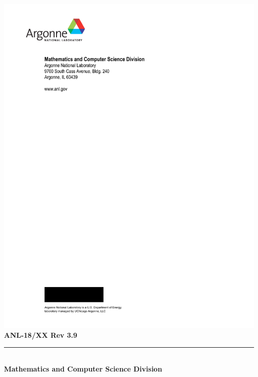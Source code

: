 
%



\def\shortintro{false}

\usepackage{fancyhdr,lastpage}
\pagestyle{fancy}



\pagestyle{empty}
\hspace{-.65in}\includegraphics{ArgonneLogo}
\hfill  {\large {\bf ANL-18/XX Rev 3.9}}

\vspace*{2in}
\vspace*{8pt}
\hrule
\vspace*{8pt}

\vspace*{1in}
\noindent \\
{\Large {\bf Mathematics and Computer Science Division}}

